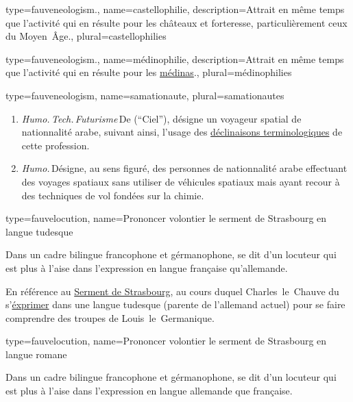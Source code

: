 {{
{
  type=fauveneologism.,
    name={castellophilie},
    description={Attrait en même temps que l’activité qui en résulte pour les châteaux et forteresse, particulièrement ceux du Moyen~Âge.},
    plural={castellophilies}
}

{
  type=fauveneologism.,
    name={médinophilie},
    description={Attrait en même temps que l’activité qui en résulte pour les \href{https://fr.wikipedia.org/wiki/Médina}{médinas}.},
    plural={médinophilies}
}

{
  type=fauveneologism,
    name={samationaute},
    plural={samationautes}
}
{
  \begin{enumerate}
    \item \emph{Humo.\,Tech.\,Futurisme}\,De  (\enquote{Ciel}), désigne un voyageur spatial de nationnalité arabe, suivant ainsi, l’usage des \href{https://fr.wikipedia.org/wiki/Astronaute\#Terminologie}{déclinaisons terminologiques} de cette profession.

    \item \emph{Humo.}\,Désigne, au sens figuré, des personnes de nationnalité arabe effectuant des voyages spatiaux sans utiliser de véhicules spatiaux mais ayant recour à des techniques de vol fondées sur la chimie.
  \end{enumerate}
}


{
  type=fauvelocution,
    name={Prononcer volontier le serment de Strasbourg en langue tudesque}
}
{
  Dans un cadre bilingue francophone et gérmanophone, se dit d’un locuteur qui est plus à l’aise dans l’expression en langue française qu’allemande.

  En référence au \href{https://fr.wikipedia.org/wiki/Serments\_de\_Strasbourg}{Serment de Strasbourg}, au cours duquel Charles~le Chauve du s’\href{https://fr.wikipedia.org/wiki/Serments\_de\_Strasbourg\#Le\_serment\_de\_Charles\_et\_des\_troupes\_de\_Louis\_en\_tudesque}{éxprimer} dans une langue tudesque (parente de l’allemand actuel) pour se faire comprendre des troupes de Louis~le~Germanique.
}

{
  type=fauvelocution,
    name={Prononcer volontier le serment de Strasbourg en langue romane}
}
{
  Dans un cadre bilingue francophone et gérmanophone, se dit d’un locuteur qui est plus à l’aise dans l’expression en langue allemande que française.

}}}
